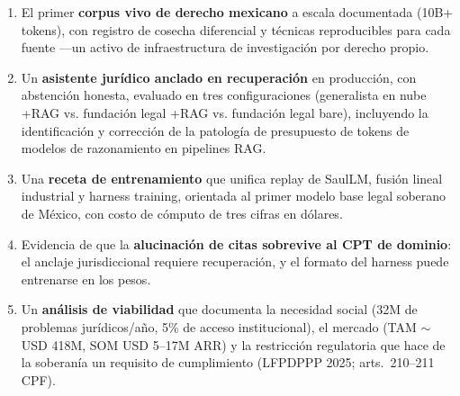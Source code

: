 \begin{enumerate}
\item El primer \textbf{corpus vivo de derecho mexicano} a escala documentada (10B+ tokens), con registro de cosecha diferencial y técnicas reproducibles para cada fuente ---un activo de infraestructura de investigación por derecho propio.
\item Un \textbf{asistente jurídico anclado en recuperación} en producción, con abstención honesta, evaluado en tres configuraciones (generalista en nube +RAG vs. fundación legal +RAG vs. fundación legal bare), incluyendo la identificación y corrección de la patología de presupuesto de tokens de modelos de razonamiento en pipelines RAG.
\item Una \textbf{receta de entrenamiento} que unifica replay de SaulLM, fusión lineal industrial y harness training, orientada al primer modelo base legal soberano de México, con costo de cómputo de tres cifras en dólares.
\item Evidencia de que la \textbf{alucinación de citas sobrevive al CPT de dominio}: el anclaje jurisdiccional requiere recuperación, y el formato del harness puede entrenarse en los pesos.
\item Un \textbf{análisis de viabilidad} que documenta la necesidad social (32M de problemas jurídicos/año, 5\% de acceso institucional\cite{wjpmx2019,justiciaabierta2025}), el mercado (TAM $\sim$USD 418M, SOM USD 5--17M ARR) y la restricción regulatoria que hace de la soberanía un requisito de cumplimiento (LFPDPPP 2025; arts.~210--211 CPF).\cite{lfpdppp,cpf}
\end{enumerate}
